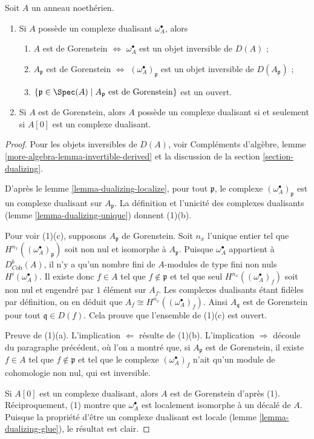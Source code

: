 \begin{lemma}
\label{lemma-gorenstein}
Soit $A$ un anneau noethérien.
\begin{enumerate}
\item Si $A$ possède un complexe dualisant $\omega_A^\bullet$, alors
\begin{enumerate}
\item $A$ est de Gorenstein $\Leftrightarrow$ $\omega_A^\bullet$ est un objet inversible de $D(A)$ ;
\item $A_\mathfrak p$ est de Gorenstein $\Leftrightarrow$
$(\omega_A^\bullet)_\mathfrak p$ est un objet inversible de $D(A_\mathfrak p)$ ;
\item $\{\mathfrak p \in \Spec(A) \mid A_\mathfrak p\text{ est de Gorenstein}\}$ est un ouvert.
\end{enumerate}
\item Si $A$ est de Gorenstein, alors $A$ possède un complexe dualisant
si et seulement si $A[0]$ est un complexe dualisant.
\end{enumerate}
\end{lemma}

\begin{proof}
Pour les objets inversibles de $D(A)$, voir Compléments d'algèbre,
lemme \ref{more-algebra-lemma-invertible-derived} et la discussion de la section \ref{section-dualizing}.

\medskip\noindent
D'après le lemme \ref{lemma-dualizing-localize}, pour tout $\mathfrak p$, le complexe $(\omega_A^\bullet)_\mathfrak p$
est un complexe dualisant sur $A_\mathfrak p$.
La définition et l'unicité des complexes dualisants (lemme \ref{lemma-dualizing-unique})
donnent (1)(b).

\medskip\noindent
Pour voir (1)(c), supposons $A_\mathfrak p$ de Gorenstein.
Soit $n_x$ l'unique entier tel que $H^{n_{x}}((\omega_A^\bullet)_\mathfrak p)$ soit non nul et isomorphe à $A_\mathfrak p$.
Puisque $\omega_A^\bullet$ appartient à $D^b_{\textit{Coh}}(A)$, il n'y a qu'un nombre fini
de $A$-modules de type fini non nuls $H^i(\omega_A^\bullet)$.
Il existe donc $f \in A$ tel que $f \not \in \mathfrak p$ et tel que seul $H^{n_x}((\omega_A^\bullet)_f)$
soit non nul et engendré par $1$ élément sur $A_f$.
Les complexes dualisants étant fidèles par définition, on en déduit que $A_f \cong H^{n_x}((\omega_A^\bullet)_f)$.
Ainsi $A_\mathfrak q$ est de Gorenstein pour tout $\mathfrak q \in D(f)$.
Cela prouve que l'ensemble de (1)(c) est ouvert.

\medskip\noindent
Preuve de (1)(a). L'implication $\Leftarrow$ résulte de (1)(b).
L'implication $\Rightarrow$ découle du paragraphe précédent,
où l'on a montré que, si $A_\mathfrak p$ est de Gorenstein,
il existe $f \in A$ tel que $f \not \in \mathfrak p$ et tel que le complexe $(\omega_A^\bullet)_f$
n'ait qu'un module de cohomologie non nul, qui est inversible.

\medskip\noindent
Si $A[0]$ est un complexe dualisant, alors $A$ est de Gorenstein d'après (1).
Réciproquement, (1) montre que $\omega_A^\bullet$ est localement isomorphe à un décalé de $A$.
Puisque la propriété d'être un complexe dualisant est locale
(lemme \ref{lemma-dualizing-glue}), le résultat est clair.
\end{proof}

